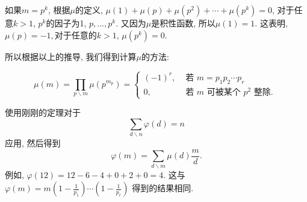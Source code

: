 \documentclass{ctexart}
\begin{document}
如果$m=p^k$, 根据$\mu$的定义, $
\mu(1)+\mu(p)+\mu\left(p^2\right)+\cdots+\mu\left(p^k\right)=0
$, 对于任意$k>1$, $p^k$的因子为1, $p, ..., p^k$. 又因为$\mu$是积性函数, 所以$\mu(1)=1$. 这表明, $\mu(p)=-1,$对于任意的$k>1$, $\mu(p^k)=0$. 

所以根据以上的推导, 我们得到计算$\mu$的方法: 

\begin{prop}
    $$
\mu(m)=\prod_{p \backslash m} \mu\left(p^{m_p}\right)= \begin{cases}(-1)^r, & \text { 若 } m=p_1 p_2 \cdots p_r \\ 0, & \text { 若 } m \text { 可被某个 } p^2 \text { 整除. }\end{cases}
$$
    
\end{prop}

\begin{example}
    使用刚刚的定理对于
    $$
\sum_{d \backslash n} \varphi(d)=n
$$
应用, 然后得到
$$
\varphi(m)=\sum_{d \backslash m} \mu(d) \frac{m}{d} .
$$
例如, $\varphi(12)=12-6-4+0+2+0=4$. 这与 $\varphi(m)=m\left(1-\frac{1}{p_1}\right) \cdots\left(1-\frac{1}{p_r}\right)$ 得到的结果相同.
\end{example}
\end{document}
